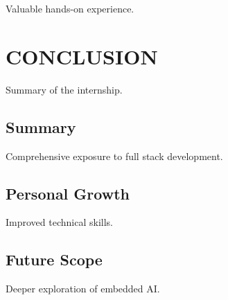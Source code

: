 \documentclass[12pt,a4paper]{report}
\begin{document}
Valuable hands-on experience.




\chapter{CONCLUSION}
\label{ch:conclusion}


Summary of the internship.




\section{Summary}

Comprehensive exposure to full stack development.


\section{Personal Growth}

Improved technical skills.


\section{Future Scope}

Deeper exploration of embedded AI.
\end{document}
